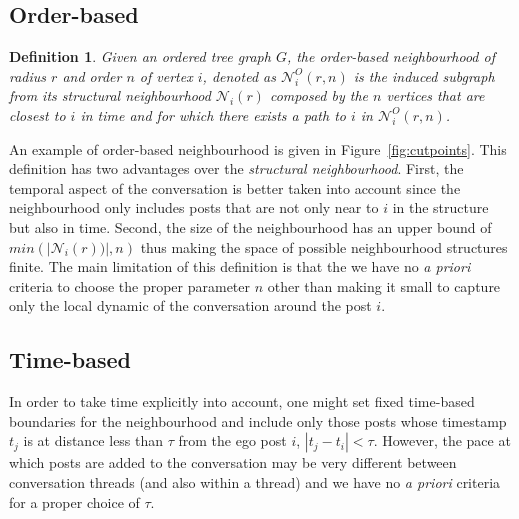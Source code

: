 \documentclass[conference]{IEEEtran}
\newtheorem{definition}{Definition}
\begin{document}
\subsection{Order-based}
\begin{definition}
Given an ordered tree graph $G$, the \textit{order-based neighbourhood} of radius $r$ and order $n$ of vertex $i$, denoted as $\mathcal{N}_{i}^O(r,n)$ is the induced subgraph from its structural neighbourhood $\mathcal{N}_{i}(r)$ composed by the $n$ vertices that are closest to $i$ in time and for which there exists a path to $i$ in $\mathcal{N}_{i}^O(r,n)$.  
\end{definition}
An example of order-based neighbourhood is given in Figure~\ref{fig:cutpoints}.
This definition has two advantages over the \textit{structural neighbourhood}. First, the temporal aspect of the conversation is better taken into account since the neighbourhood only includes posts that are not only near to $i$ in the structure but also in time. Second, the size of the neighbourhood has an upper bound of $min(|\mathcal{N}_i(r))|, n)$ thus making the space of possible neighbourhood structures finite. The main limitation of this definition is that the we have no \textit{a priori} criteria to choose the proper parameter $n$ other than making it small to capture only the local dynamic of the conversation around the post $i$.

\subsection{Time-based}
In order to take time explicitly into account, one might set fixed time-based boundaries for the neighbourhood and include only those posts whose timestamp $t_j$ is at distance less than $\tau$ from the ego post $i$, $|t_j-t_i|<\tau$. However, the pace at which posts are added to the conversation may be very different between conversation threads (and also within a thread) and we have no \textit{a priori} criteria for a proper choice of $\tau$. 
\end{document}
